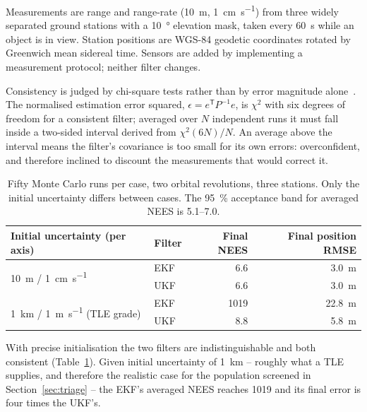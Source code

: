 \documentclass[11pt]{article}
\begin{document}
Measurements are range and range-rate (\SI{10}{\meter},
\SI{1}{\centi\meter\per\second}) from three widely separated ground
stations with a \SI{10}{\degree} elevation mask, taken every
\SI{60}{\second} while an object is in view. Station positions are WGS-84
geodetic coordinates rotated by Greenwich mean sidereal time. Sensors are
added by implementing a measurement protocol; neither filter changes.

Consistency is judged by chi-square tests rather than by error magnitude
alone~\cite{barshalom}. The normalised estimation error squared,
$\epsilon = e^{\mathsf T} P^{-1} e$, is $\chi^2$ with six degrees of freedom
for a consistent filter; averaged over $N$ independent runs it must fall
inside a two-sided interval derived from $\chi^2(6N)/N$. An average above
the interval means the filter's covariance is too small for its own errors:
overconfident, and therefore inclined to discount the measurements that
would correct it.

\begin{table}[htbp]
\centering
\caption{Fifty Monte Carlo runs per case, two orbital revolutions, three
         stations. Only the initial uncertainty differs between cases. The
         \SI{95}{\percent} acceptance band for averaged NEES is
         \numrange{5.1}{7.0}.}
\label{tab:filters}
\begin{tabular}{llrr}
\toprule
Initial uncertainty (per axis) & Filter & {Final NEES} & {Final position RMSE} \\
\midrule
\multirow{2}{*}{\SI{10}{\meter} / \SI{1}{\centi\meter\per\second}}
 & EKF & 6.6 & \SI{3.0}{\meter} \\
 & UKF & 6.6 & \SI{3.0}{\meter} \\
\midrule
\multirow{2}{*}{\SI{1}{\kilo\meter} / \SI{1}{\meter\per\second} (TLE grade)}
 & EKF & \num{1019} & \SI{22.8}{\meter} \\
 & UKF & 8.8 & \SI{5.8}{\meter} \\
\bottomrule
\end{tabular}
\end{table}

With precise initialisation the two filters are indistinguishable and both
consistent (Table~\ref{tab:filters}). Given initial uncertainty of
\SI{1}{\kilo\meter} -- roughly what a TLE supplies, and therefore the
realistic case for the population screened in Section~\ref{sec:triage} --
the EKF's averaged NEES reaches \num{1019} and its final error is four times
the UKF's.
\end{document}
